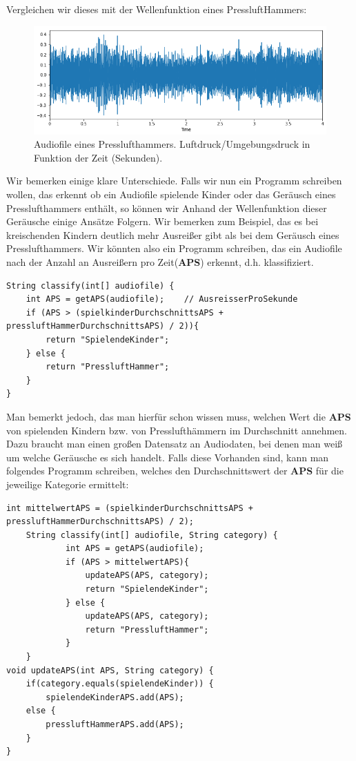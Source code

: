 \documentclass{thesisclass}
\begin{document}
Vergleichen wir dieses mit der Wellenfunktion eines PressluftHammers:
\begin{figure}[h!]
\includegraphics[width=\textwidth]{images/jackhammer.png}
  \caption{Audiofile eines Presslufthammers. Luftdruck/Umgebungsdruck in Funktion der Zeit (Sekunden). \cite{shaikh_faizan_2017}}
  \label{fig:Audiofile pressluftHammer}
\end{figure}

Wir bemerken einige klare Unterschiede. Falls wir nun ein Programm schreiben wollen, das erkennt ob ein Audiofile spielende Kinder oder das Geräusch eines Presslufthammers enthält, so können wir Anhand der Wellenfunktion dieser Geräusche einige Ansätze Folgern. Wir bemerken zum Beispiel, das es bei kreischenden Kindern deutlich mehr Ausreißer gibt als bei dem Geräusch eines Presslufthammers. Wir könnten also ein Programm schreiben, das ein Audiofile nach der Anzahl an Ausreißern pro Zeit(\textbf{APS}) erkennt, d.h. klassifiziert.
\newpage
\begin{lstlisting}
String classify(int[] audiofile) {
   	int APS = getAPS(audiofile); 	// AusreisserProSekunde
	if (APS > (spielkinderDurchschnittsAPS + pressluftHammerDurchschnittsAPS) / 2)){
		return "SpielendeKinder";
	} else {
		return "PressluftHammer";
	}
}
\end{lstlisting}

Man bemerkt jedoch, das man hierfür schon wissen muss, welchen Wert die \textbf{APS} von spielenden Kindern bzw. von Presslufthämmern im Durchschnitt annehmen. Dazu braucht man einen großen Datensatz an Audiodaten, bei denen man weiß um welche Geräusche es sich handelt. Falls diese Vorhanden sind, kann man folgendes Programm schreiben, welches den Durchschnittswert der \textbf{APS} für die jeweilige Kategorie ermittelt:

\begin{lstlisting}
int mittelwertAPS = (spielkinderDurchschnittsAPS + pressluftHammerDurchschnittsAPS) / 2);
    String classify(int[] audiofile, String category) {
        	int APS = getAPS(audiofile);
			if (APS > mittelwertAPS){
				updateAPS(APS, category);		
				return "SpielendeKinder";
			} else {
				updateAPS(APS, category);
				return "PressluftHammer";
			}
    }   
void updateAPS(int APS, String category) {
	if(category.equals(spielendeKinder)) {
		spielendeKinderAPS.add(APS);
	else {
		pressluftHammerAPS.add(APS);
	}
}
\end{lstlisting}
\end{document}
